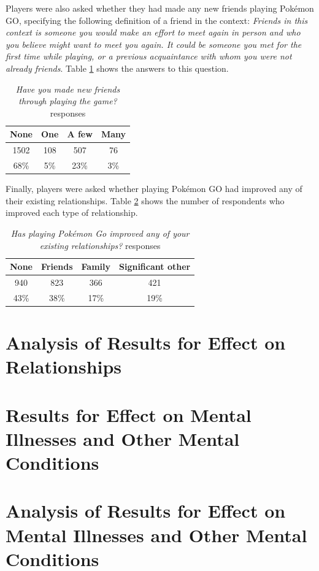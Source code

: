 Players were also asked whether they had made any new friends playing Pokémon GO, specifying the following definition of a friend in the context: \emph{Friends in this context is someone you would make an effort to meet again in person and who you believe might want to meet you again. It could be someone you met for the first time while playing, or a previous acquaintance with whom you were not already friends}. Table \ref{tbl:new-friends} shows the answers to this question.

\begin{table}[h]
	\centering
	\caption{\emph{Have you made new friends through playing the game?} responses}
	\label{tbl:new-friends}
	\begin{tabular}{|c|c|c|c|}
		\hline
		\textbf{None}	& \textbf{One}	& \textbf{A few}	& \textbf{Many}\\
		\hline\hline
		1502			& 108			& 507				& 76\\
		68\%			& 5\%			& 23\%				& 3\%\\\hline
	\end{tabular}
\end{table}

Finally, players were asked whether playing Pokémon GO had improved any of their existing relationships. Table \ref{tbl:existing-relationships} shows the number of respondents who improved each type of relationship.

\begin{table}[h]
	\centering
	\caption{\emph{Has playing Pokémon Go improved any of your existing relationships?} responses}
	\label{tbl:existing-relationships}
	\begin{tabular}{|c|c|c|c|}
		\hline
		\textbf{None} & \textbf{Friends}& \textbf{Family}	& \textbf{Significant other}\\
		\hline\hline
		940			& 823				& 366				& 421\\
		43\%		& 38\%				& 17\%				& 19\%\\\hline
	\end{tabular}
\end{table}

\section{Analysis of Results for Effect on Relationships}


\section{Results for Effect on Mental Illnesses and Other Mental Conditions}

\section{Analysis of Results for Effect on Mental Illnesses and Other Mental Conditions}

